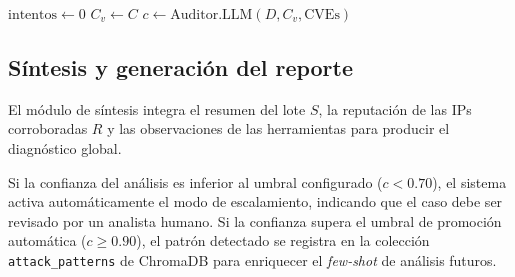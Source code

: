 \begin{algorithm}[H]
\caption{Ejecución agéntica con LangGraph}
\label{alg:ejecucion}
$\text{intentos} \leftarrow 0$\;
$C_v \leftarrow C$\;
$c \leftarrow \text{Auditor.LLM}(D, C_v, \text{CVEs})$\;
\;
\end{algorithm}

\subsection{Síntesis y generación del reporte}

El módulo de síntesis integra el resumen del lote $S$, la
reputación de las IPs corroboradas $R$ y las observaciones
de las herramientas para producir el diagnóstico global.

Si la confianza del análisis es inferior al umbral
configurado ($c < 0.70$), el sistema activa automáticamente
el modo de escalamiento, indicando que el caso debe ser
revisado por un analista humano. Si la confianza supera el
umbral de promoción automática ($c \geq 0.90$), el patrón
detectado se registra en la colección
\texttt{attack\_patterns} de ChromaDB para enriquecer el
\textit{few-shot} de análisis futuros.

